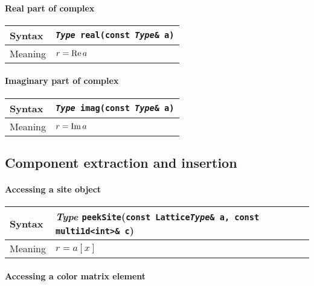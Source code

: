 \documentclass[12pt,letterpaper]{article}
\renewcommand{\Re}{\mathop{\rm Re}}
\renewcommand{\Im}{\mathop{\rm Im}}
\newcommand{\protoUnaryQual}[1]{{\tt {\it Type} #1(const {\it Type}\& a)}}
\begin{document}
\paragraph{Real part of complex}

\begin{flushleft}
  \begin{tabular}{|l|l|}
  \hline
  Syntax      & \protoUnaryQual{\tt real}  \\
  \hline
  Meaning     & $r = \Re a$ \\
  \hline
  \end{tabular}
\end{flushleft}

\paragraph{Imaginary part of complex}

\begin{flushleft}
  \begin{tabular}{|l|l|}
  \hline
  Syntax      & \protoUnaryQual{\tt imag}  \\
  \hline
  Meaning     & $r = \Im a$ \\
  \hline
  \end{tabular}
\end{flushleft}

\subsection{Component extraction and insertion}
\paragraph{Accessing a site object}

\begin{flushleft}
  \begin{tabular}{|l|l|}
  \hline
  Syntax      & {\it Type} \verb|peekSite|({\tt const Lattice{\it Type}\& a, const multi1d<int>\& c})\\
  \hline
  Meaning     & $r = a[x]$\\
  \hline
  \end{tabular}
\end{flushleft}

\paragraph{Accessing a color matrix element}
\end{document}
